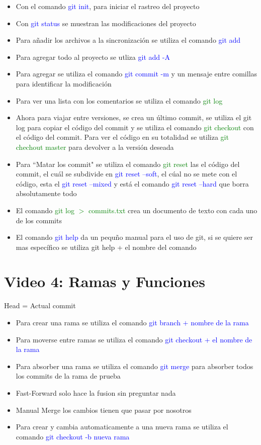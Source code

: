 \documentclass{article}
\begin{document}
	\begin{itemize}
		\item Con el comando \textcolor{blue}{git init}, para iniciar el rastreo del proyecto
		\item Con \textcolor{blue}{git status} se muestran las modificaciones del proyecto
		\item Para añadir los archivos a la sincronización se utiliza el comando \textcolor{blue}{git add}
		\item Para agregar todo al proyecto se utliza \textcolor{blue}{git add -A}
		\item Para agregar se utiliza el comando \textcolor{blue}{git commit -m} y un mensaje entre comillas para identificar la modificación
		\item Para ver una lista con los comentarios se utiliza el comando \textcolor{green}{git log}
		\item Ahora para viajar entre versiones, se crea un último commit, se utiliza el git log para copiar el código del commit y se utiliza el comando \textcolor{green}{git checkout} con el código del commit. Para ver el código en su totalidad se utiliza \textcolor{green}{git chechout master} para devolver a la versión deseada
		\item Para ``Matar los commit" se utiliza el comando \textcolor{green}{git reset} las el código del commit, el cuál se subdivide en \textcolor{blue}{git reset --soft}, el cúal no se mete con el código, esta el \textcolor{blue}{git reset --mixed} y está el comando \textcolor{blue}{git reset --hard} que borra absolutamente todo
		\item El comando \textcolor{green}{git log $>$ commits.txt} crea un documento de texto con cada uno de los commits
		\item El comando \textcolor{blue}{git help} da un pequño manual para el uso de git, si se quiere ser mas específico se utiliza git help + el nombre del comando
		
	\end{itemize}


	\section{Video 4: Ramas y Funciones}
	
	Head = Actual commit
	
	\begin{itemize}
	\item Para crear una rama se utiliza el comando \textcolor{blue}{git branch $+$ nombre de la rama}
	\item Para moverse entre ramas se utiliza el comando \textcolor{blue}{git checkout + el nombre de la rama}
	\item Para absorber una rama se utiliza el comando \textcolor{blue}{git merge} para absorber todos los commits de la rama de prueba
	\item Fast-Forward solo hace la fusion sin preguntar nada
	\item Manual Merge los cambios tienen que pasar por nosotros
	\item Para crear y cambia automaticamente a una nueva rama se utiliza el comando \textcolor{blue}{git checkout -b nueva rama}
	\end{itemize}
\end{document}
